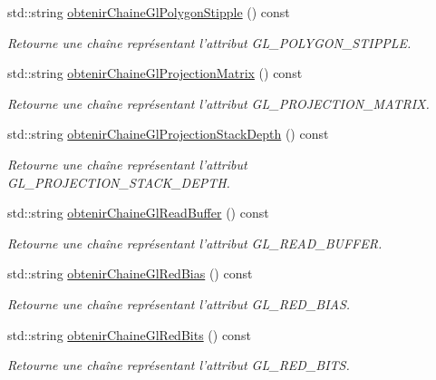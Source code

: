 \begin{DoxyCompactItemize}
std\-::string \hyperlink{group__utilitaire_ga53fd366a5e9d6eef773c883b1d2914d5}{obtenir\-Chaine\-Gl\-Polygon\-Stipple} () const 
\begin{DoxyCompactList}\small\item\em Retourne une chaîne représentant l'attribut G\-L\-\_\-\-P\-O\-L\-Y\-G\-O\-N\-\_\-\-S\-T\-I\-P\-P\-L\-E. \end{DoxyCompactList}\item 
std\-::string \hyperlink{group__utilitaire_ga4e56c1c62378ae9385db874bf2b6a030}{obtenir\-Chaine\-Gl\-Projection\-Matrix} () const 
\begin{DoxyCompactList}\small\item\em Retourne une chaîne représentant l'attribut G\-L\-\_\-\-P\-R\-O\-J\-E\-C\-T\-I\-O\-N\-\_\-\-M\-A\-T\-R\-I\-X. \end{DoxyCompactList}\item 
std\-::string \hyperlink{group__utilitaire_gad2d5e19c001663ff2943c43cc9b0c0ea}{obtenir\-Chaine\-Gl\-Projection\-Stack\-Depth} () const 
\begin{DoxyCompactList}\small\item\em Retourne une chaîne représentant l'attribut G\-L\-\_\-\-P\-R\-O\-J\-E\-C\-T\-I\-O\-N\-\_\-\-S\-T\-A\-C\-K\-\_\-\-D\-E\-P\-T\-H. \end{DoxyCompactList}\item 
std\-::string \hyperlink{group__utilitaire_ga5d3a759c6f7b623d7598708ca4810b00}{obtenir\-Chaine\-Gl\-Read\-Buffer} () const 
\begin{DoxyCompactList}\small\item\em Retourne une chaîne représentant l'attribut G\-L\-\_\-\-R\-E\-A\-D\-\_\-\-B\-U\-F\-F\-E\-R. \end{DoxyCompactList}\item 
std\-::string \hyperlink{group__utilitaire_ga4db73eaaf942ff5c5aa9b62e0386f9a9}{obtenir\-Chaine\-Gl\-Red\-Bias} () const 
\begin{DoxyCompactList}\small\item\em Retourne une chaîne représentant l'attribut G\-L\-\_\-\-R\-E\-D\-\_\-\-B\-I\-A\-S. \end{DoxyCompactList}\item 
std\-::string \hyperlink{group__utilitaire_gac4060a4139d031b9f8b9b1198c4a89f5}{obtenir\-Chaine\-Gl\-Red\-Bits} () const 
\begin{DoxyCompactList}\small\item\em Retourne une chaîne représentant l'attribut G\-L\-\_\-\-R\-E\-D\-\_\-\-B\-I\-T\-S. \end{DoxyCompactList}\item 

\end{DoxyCompactItemize}

